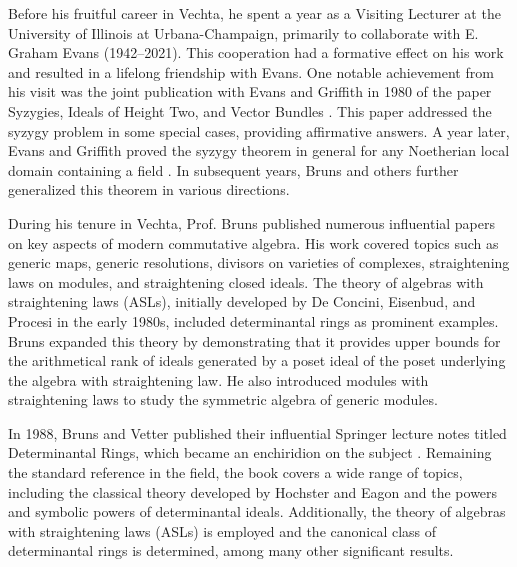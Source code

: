 \documentclass[10pt]{amsart}
\begin{document}
	Before his fruitful career in Vechta, he spent a year as a Visiting Lecturer at the University of Illinois at Urbana-Champaign, primarily to collaborate with E. Graham Evans (1942--2021). This cooperation had a formative effect on his work and resulted in a lifelong friendship with Evans. One notable achievement from his visit was the joint publication with Evans and Griffith in 1980 of the paper Syzygies, Ideals of Height Two, and Vector Bundles \cite{BrunsEvansGriffith1980}. This paper addressed the syzygy problem in some special cases, providing affirmative answers. A year later, Evans and Griffith proved the syzygy theorem in general for any Noetherian local domain containing a field \cite{EvansGriffith1981}. In subsequent years, Bruns and others further generalized this theorem in various directions.
	
	During his tenure in Vechta, Prof. Bruns published numerous influential papers on key aspects of modern commutative algebra. His work covered topics such as generic maps, generic resolutions, divisors on varieties of complexes, straightening laws on modules, and straightening closed ideals. The theory of algebras with straightening laws (ASLs), initially developed by De Concini, Eisenbud, and Procesi in the early 1980s, included determinantal rings as prominent examples. Bruns expanded this theory by demonstrating that it provides upper bounds for the arithmetical rank of ideals generated by a poset ideal of the poset underlying the algebra with straightening law. He also introduced modules with straightening laws to study the symmetric algebra of generic modules.
	
	In 1988, Bruns and Vetter published their influential Springer lecture notes titled Determinantal Rings, which became an enchiridion on the subject \cite{BrunsVetter1988}. Remaining the standard reference in the field, the book covers a wide range of topics, including the classical theory developed by Hochster and Eagon and the powers and symbolic powers of determinantal ideals. Additionally, the theory of algebras with straightening laws (ASLs) is employed and the canonical class of determinantal rings is determined, among many other significant results.
	
\end{document}

